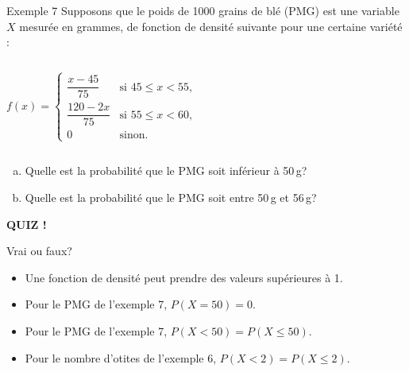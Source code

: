\documentclass{BeamerTemplate}
\begin{document}
\begin{frame}[t]{Exemple 7}
  Supposons que le poids de 1000 grains de blé (PMG) est une variable $X$
  mesurée en grammes, de fonction de densité suivante pour une certaine
  variété :
  \begin{columns}[c]
      \[
        f(x) =
        \begin{cases}
          \dfrac{x - 45}{75} & \text{si } 45 \le x < 55, \\[3mm]
          \dfrac{120 - 2x}{75} & \text{si } 55 \le x < 60, \\[3mm]
          0 & \text{sinon.}
        \end{cases}
      \]
  \end{columns}

  \medskip
  \begin{enumerate}[a)]
    \item<2-> Quelle est la probabilité que le PMG soit inférieur à 50\,g?
    \item<3-> Quelle est la probabilité que le PMG soit entre 50\,g et 56\,g?
  \end{enumerate}
\end{frame}

\begin{frame}[plain,t]
  \centerline{\LARGE\bfseries\alert{QUIZ !}}

  \medskip
  Vrai ou faux?
  \begin{itemize}\itemsep 1.0cm
    \item Une fonction de densité peut prendre des valeurs supérieures à 1.
    \item Pour le PMG de l'exemple 7, $P(X = 50) = 0$.
    \item Pour le PMG de l'exemple 7, $P(X < 50) = P(X \le 50)$.
    \item<2-> Pour le nombre d'otites de l'exemple 6, $P(X < 2) = P(X \le 2)$.
  \end{itemize}
\end{frame}
\end{document}
